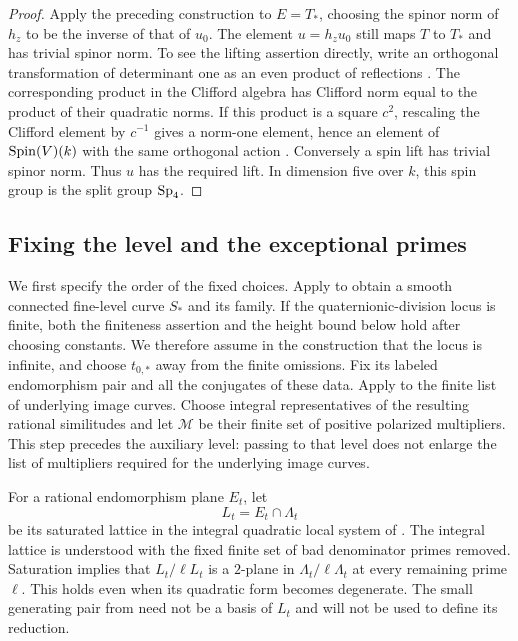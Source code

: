 \begin{proof}
Apply the preceding construction to $E=T_*$, choosing the spinor norm
of $h_z$ to be the inverse of that of $u_0$.  The element $u=h_zu_0$ still
maps $T$ to $T_*$ and has trivial spinor norm.  To see the lifting
assertion directly,
write an orthogonal transformation of determinant one as an even product
of reflections \cite[Theorem~1.32]{SchulzePillot2020}.  The corresponding product in the Clifford algebra has
Clifford norm equal to the product of their quadratic norms.  If this
product is a square $c^2$, rescaling the Clifford element by $c^{-1}$
gives a norm-one element, hence an element of $\operatorname{Spin}(V)(k)$ with the
same orthogonal action \cite[Corollary~9.6 and Definition~9.7]{SchulzePillot2020}.
Conversely a spin lift has trivial spinor norm.
Thus $u$ has the required lift.  In dimension five over $k$, this spin
group is the split group $\operatorname{Sp}_4$.
\end{proof}

\subsection{Fixing the level and the exceptional primes}

We first specify the order of the fixed choices.  Apply
 to obtain a smooth connected fine-level curve
$S_*$ and its family.  If the quaternionic-division locus is finite, both
the finiteness
assertion and the height bound below hold after choosing constants.  We
therefore assume in the construction that the locus is infinite, and
choose $t_{0,*}$ away from the finite omissions.  Fix its labeled
endomorphism pair and all the conjugates of
these data.  Apply  to the finite list of
underlying image curves.  Choose integral representatives of the resulting
rational similitudes and let $\mathcal M$ be their finite set of positive
polarized multipliers.  This step precedes the auxiliary level: passing to
that level does not enlarge the list of multipliers required for the
underlying image curves.

For a rational endomorphism plane $E_t$, let
\[
 L_t=E_t\cap\Lambda_t
\]
be its saturated lattice in the integral quadratic local system of
.  The integral lattice is understood with the fixed
finite set of bad denominator primes removed.  Saturation implies that
$L_t/\ell L_t$ is a $2$-plane in $\Lambda_t/\ell\Lambda_t$ at every remaining
prime $\ell$.  This holds even when its quadratic form becomes degenerate.
The small generating pair from  need not be a basis
of $L_t$ and will not be used to define its reduction.

